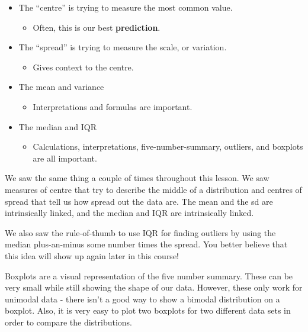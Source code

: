 \documentclass[
  letterpaper,
  DIV=11,
  numbers=noendperiod]{scrreprt}
\providecommand{\tightlist}{%
  \setlength{\itemsep}{0pt}\setlength{\parskip}{0pt}}\usepackage{longtable,booktabs,array}
\begin{document}
\begin{itemize}
\tightlist
\item
  The ``centre'' is trying to measure the most common value.

  \begin{itemize}
  \tightlist
  \item
    Often, this is our best \textbf{prediction}.\lspace
  \end{itemize}
\item
  The ``spread'' is trying to measure the scale, or variation.

  \begin{itemize}
  \tightlist
  \item
    Gives context to the centre.\lspace
  \end{itemize}
\item
  The mean and variance

  \begin{itemize}
  \tightlist
  \item
    Interpretations and formulas are important.\lspace
  \end{itemize}
\item
  The median and IQR

  \begin{itemize}
  \tightlist
  \item
    Calculations, interpretations, five-number-summary, outliers, and
    boxplots are all important.
  \end{itemize}
\end{itemize}

We saw the same thing a couple of times throughout this lesson. We saw
measures of centre that try to describe the middle of a distribution and
centres of spread that tell us how spread out the data are. The mean and
the sd are intrinsically linked, and the median and IQR are
intrinsically linked.

We also saw the rule-of-thumb to use IQR for finding outliers by using
the median plus-an-minus some number times the spread. You better
believe that this idea will show up again later in this course!

Boxplots are a visual representation of the five number summary. These
can be very small while still showing the shape of our data. However,
these only work for unimodal data - there isn't a good way to show a
bimodal distribution on a boxplot. Also, it is very easy to plot two
boxplots for two different data sets in order to compare the
distributions.
\end{document}
